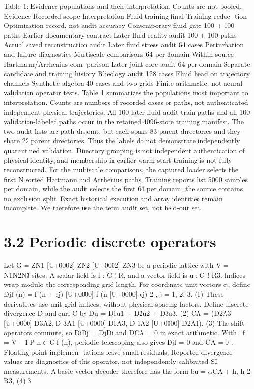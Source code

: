 \documentclass[11pt]{article}
\begin{document}
Table 1: Evidence populations and their interpretation. Counts are not pooled.
Evidence Recorded scope Interpretation
Fluid training-final Training reduc-
tion
Optimization record, not audit accuracy
Contemporary fluid gate 100 + 100 paths Earlier documentary contract
Later fluid reality audit 100 + 100 paths Actual saved reconstruction audit
Later fluid stress audit 64 cases Perturbation and failure diagnostics
Multiscale comparisons 64 per domain Within-source Hartmann/Arrhenius com-
parison
Later joint core audit 64 per domain Separate candidate and training history
Rheology audit 128 cases Fluid head on trajectory channels
Synthetic algebra 40 cases and two
grids
Finite arithmetic, not neural validation
operator tests. Table 1 summarizes the populations most important to interpretation. Counts are
numbers of recorded cases or paths, not authenticated independent physical trajectories.
All 100 later fluid audit train paths and all 100 validation-labeled paths occur in the retained
4096-store training manifest. The two audit lists are path-disjoint, but each spans 83 parent
directories and they share 22 parent directories. Thus the labels do not demonstrate independently
quarantined validation. Directory grouping is not independent authentication of physical identity,
and membership in earlier warm-start training is not fully reconstructed.
For the multiscale comparisons, the captured loader selects the first N sorted Hartmann and
Arrhenius paths. Training reports list 5000 samples per domain, while the audit selects the first 64
per domain; the source contains no exclusion split. Exact historical execution and array identities
remain incomplete. We therefore use the term audit set, not held-out set.

\section*{3.2 Periodic discrete operators}

Let G = ZN1 [U+0002] ZN2 [U+0002] ZN3 be a periodic lattice with V = N1N2N3 sites. A scalar field is f : G ! R,
and a vector field is u : G ! R3. Indices wrap modulo the corresponding grid length. For coordinate
unit vectors ej, define
Djf (n) = f (n + ej) [U+0000] f (n [U+0000] ej)
2 , j = 1, 2, 3. (1)
These derivatives use unit grid indices, without physical spacing factors. Define discrete divergence
D and curl C by
Du = D1u1 + D2u2 + D3u3, (2)
CA = (D2A3 [U+0000] D3A2, D 3A1 [U+0000] D1A3, D 1A2 [U+0000] D2A1). (3)
The shift operators commute, so DiDj = DjDi and DCA = 0 in exact arithmetic. With ¯f =
V \ensuremath{-}1 P
n\ensuremath{\in}G f (n), periodic telescoping also gives Djf = 0 and CA = 0 . Floating-point implemen-
tations leave small residuals. Reported divergence values are diagnostics of this operator, not
independently calibrated SI measurements.
A basic vector decoder therefore has the form
bu = \ensuremath{\alpha}CA + h, h 2 R3, (4)
3
\end{document}
